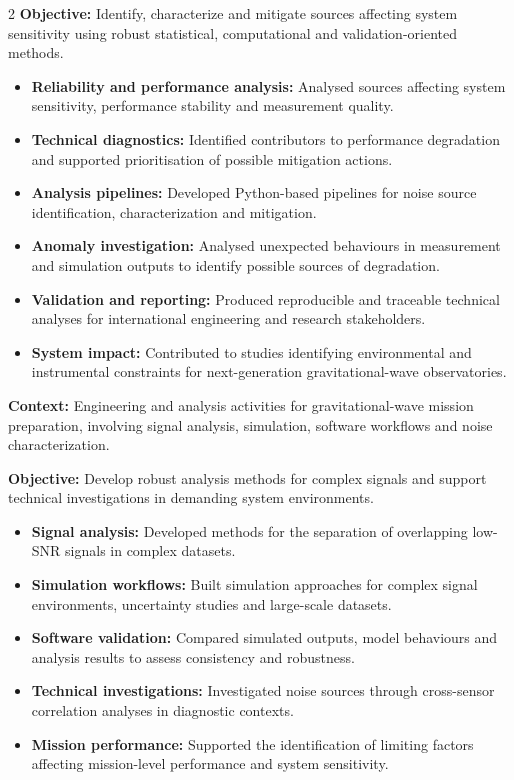 \documentclass[8pt,a4paper,ragged2e,withhyper]{altacv}
\begin{document}
\begin{paracol}{2}
\textbf{Objective:} Identify, characterize and mitigate sources affecting system sensitivity using robust statistical, computational and validation-oriented methods.

\begin{itemize}
  \item \textbf{Reliability and performance analysis:} Analysed sources affecting system sensitivity, performance stability and measurement quality.
  \item \textbf{Technical diagnostics:} Identified contributors to performance degradation and supported prioritisation of possible mitigation actions.
  \item \textbf{Analysis pipelines:} Developed Python-based pipelines for noise source identification, characterization and mitigation.
  \item \textbf{Anomaly investigation:} Analysed unexpected behaviours in measurement and simulation outputs to identify possible sources of degradation.
  \item \textbf{Validation and reporting:} Produced reproducible and traceable technical analyses for international engineering and research stakeholders.
  \item \textbf{System impact:} Contributed to studies identifying environmental and instrumental constraints for next-generation gravitational-wave observatories.
\end{itemize}

\divider


\textbf{Context:} Engineering and analysis activities for gravitational-wave mission preparation, involving signal analysis, simulation, software workflows and noise characterization.

\textbf{Objective:} Develop robust analysis methods for complex signals and support technical investigations in demanding system environments.

\begin{itemize}
  \item \textbf{Signal analysis:} Developed methods for the separation of overlapping low-SNR signals in complex datasets.
  \item \textbf{Simulation workflows:} Built simulation approaches for complex signal environments, uncertainty studies and large-scale datasets.
  \item \textbf{Software validation:} Compared simulated outputs, model behaviours and analysis results to assess consistency and robustness.
  \item \textbf{Technical investigations:} Investigated noise sources through cross-sensor correlation analyses in diagnostic contexts.
  \item \textbf{Mission performance:} Supported the identification of limiting factors affecting mission-level performance and system sensitivity.
\end{itemize}


\end{paracol}
\end{document}
